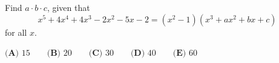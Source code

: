 Find $a\cdot b\cdot c$, given that
\[x^5+4x^4+4x^3-2x^2-5x-2=\left(x^2-1\right)\left(x^3+ax^2+bx+c\right)\]
for all $x$.

$\textbf{(A) } 15 \qquad \textbf{(B) } 20 \qquad \textbf{(C) } 30 \qquad \textbf{(D) } 40 \qquad \textbf{(E) } 60$
